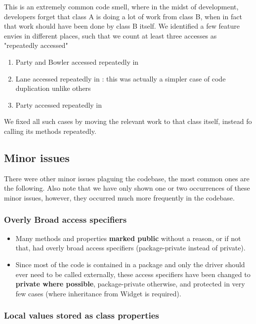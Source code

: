 This is an extremely common code smell, where in the midst of development, developers forget that class A is doing a lot of work from class B, when in fact that work should have been done by class B itself. We identified a few feature envies in different places, such that we count at least three accesses as "repeatedly accessed"

\begin{enumerate}
	\item Party and Bowler accessed repeatedly in 
	\item Lane accessed repeatedly in : this was actually a simpler case of code duplication unlike others
	\item Party accessed repeatedly in 
\end{enumerate}

We fixed all such cases by moving the relevant work to that class itself, instead fo calling its methods repeatedly.

\subsection{Minor issues}

There were other minor issues plaguing the codebase, the most common ones are the following. Also note that we have only shown one or two occurrences of these minor issues, however, they occurred much more frequently in the codebase.

\subsubsection{Overly Broad access specifiers}

\begin{itemize}

	\item Many methods and properties \textbf{marked public} without a reason, or if not that, had overly broad access specifiers (package-private instead of private).
	\item Since most of the code is contained in a package and only the driver should ever need to be called externally, these access specifiers have been changed to \textbf{private where possible}, package-private otherwise, and protected in very few cases (where inheritance from Widget is required).
\end{itemize}

\subsubsection{Local values stored as class properties}

